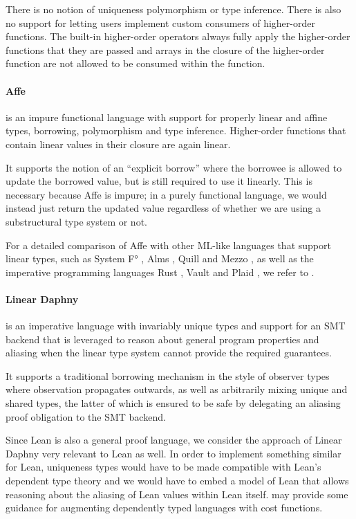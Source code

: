 There is no notion of uniqueness polymorphism or type inference. There is also no support for letting users implement custom consumers of higher-order functions. The built-in higher-order operators always fully apply the higher-order functions that they are passed and arrays in the closure of the higher-order function are not allowed to be consumed within the function.

\paragraph{Affe} \citep{radanne_kindly_2020} is an impure functional language with support for properly linear and affine types, borrowing, polymorphism and type inference. Higher-order functions that contain linear values in their closure are again linear.

It supports the notion of an ``explicit borrow'' where the borrowee is allowed to update the borrowed value, but is still required to use it linearly. This is necessary because Affe is impure; in a purely functional language, we would instead just return the updated value regardless of whether we are using a substructural type system or not.

For a detailed comparison of Affe with other ML-like languages that support linear types, such as System F° \citep{mazurak_lightweight_2010}, Alms \citep{tov_practical_2011}, Quill \citep{morris_best_2016} and Mezzo \citep{balabonski_design_2016}, as well as the imperative programming languages Rust \citep{weiss_oxide_2021}, Vault \citep{deline_enforcing_2001} and Plaid \citep{garcia_foundations_2014}, we refer to \citep{radanne_kindly_2020}.

\paragraph{Linear Daphny} \citep{li_linear_2022} is an imperative language with invariably unique types and support for an SMT backend \citep{barrett_satisfiability_2018} that is leveraged to reason about general program properties and aliasing when the linear type system cannot provide the required guarantees. 

It supports a traditional borrowing mechanism in the style of observer types \cite{goos_observers_1992} where observation propagates outwards, as well as arbitrarily mixing unique and shared types, the latter of which is ensured to be safe by delegating an aliasing proof obligation to the SMT backend.

Since Lean is also a general proof language, we consider the approach of Linear Daphny very relevant to Lean as well. In order to implement something similar for Lean, uniqueness types would have to be made compatible with Lean's dependent type theory and we would have to embed a model of Lean that allows reasoning about the aliasing of Lean values within Lean itself. \cite{niu_cost-aware_2021} may provide some guidance for augmenting dependently typed languages with cost functions.